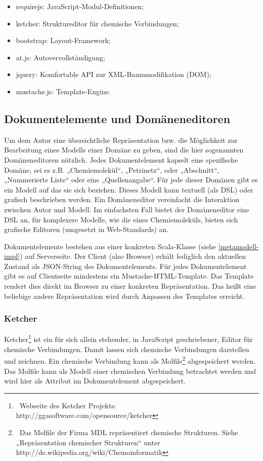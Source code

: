  
\begin{itemize}

\item requirejs: JavaScript-Modul-Definitionen;
\item ketcher: Struktureditor für chemische Verbindungen;
\item bootstrap: Layout-Framework;
\item at.js: Autovervollständigung;
\item jquery: Komfortable API zur XML-Baummodifikation (DOM);
\item mustache.js: Template-Engine.
\end{itemize}
 
\subsection{Dokumentelemente und Domäneneditoren}\label{}
 
Um dem Autor eine übersichtliche Repräsentation bzw. die Möglichkeit zur Bearbeitung eines Modells einer Domäne zu geben, sind die hier sogenannten Domäneneditoren nützlich. Jedes Dokumentelement kapselt eine spezifische Domäne, sei es z.B. „Chemiemolekül“, „Petrinetz“, oder „Abschnitt“, „Nummerierte Liste“ oder eine „Quellenangabe“. Für jede dieser Domänen gibt es ein Modell auf das sie sich beziehen. Dieses Modell kann textuell (als DSL) oder grafisch beschrieben werden. Ein Domäneneditor vereinfacht die Interaktion zwischen Autor und Modell. Im einfachsten Fall bietet der Domäneneditor eine DSL an, für komplexere Modelle, wie die eines Chemiemoleküls, bieten sich grafische Editoren (umgesetzt in Web-Standards) an.

 
Dokumentelemente bestehen aus einer konkreten Scala-Klasse (siehe \ref{metamodell-impl}) auf Serverseite. Der Client (also Browser) erhält lediglich den aktuellen Zustand als JSON-String des Dokumentelements. Für jedes Dokumentelement gibt es auf Clientseite mindestens ein Mustache-HTML-Template. Das Template rendert dies direkt im Browser zu einer konkreten Repräsentation. Das heißt eine beliebige andere Repräsentation wird durch Anpassen des Templates erreicht.

 
\subsubsection{Ketcher}\label{}

 
Ketcher\footnote{~Webseite des Ketcher Projekts: http://ggasoftware.com/opensource/ketcher} ist ein für sich allein stehender, in JavaScript geschriebener, Editor für chemische Verbindungen. Damit lassen sich chemische Verbindungen darstellen und zeichnen. Ein chemische Verbindung kann als Molfile\footnote{~Das Molfile der Firma MDL repräsentiert chemische Strukturen. Siehe „Repräsentation chemischer Strukturen“ unter http://de.wikipedia.org/wiki/Chemoinformatik } abgespeichert werden. Das Molfile kann als Modell einer chemischen Verbindung betrachtet werden und wird hier als Attribut im Dokumentelement abgespeichert.

